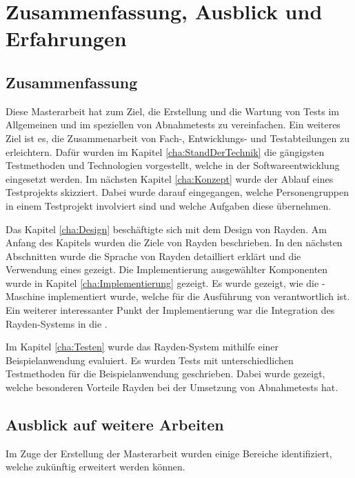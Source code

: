 \chapter{Zusammenfassung, Ausblick und Erfahrungen}
\label{cha:Zusammenfassung}

\section{Zusammenfassung}
Diese Masterarbeit hat zum Ziel, die Erstellung und die Wartung von Tests im Allgemeinen und im speziellen von Abnahmetests zu vereinfachen. Ein weiteres Ziel ist es, die Zusammenarbeit von Fach-, Entwicklungs- und Testabteilungen zu erleichtern. Dafür wurden im Kapitel \ref{cha:StandDerTechnik} die gängigsten Testmethoden und Technologien vorgestellt, welche in der Softwareentwicklung eingesetzt werden. Im nächsten Kapitel \ref{cha:Konzept} wurde der Ablauf eines Testprojekts skizziert. Dabei wurde darauf eingegangen, welche Personengruppen in einem Testprojekt involviert sind und welche Aufgaben diese übernehmen. 

\SuperPar
Das Kapitel \ref{cha:Design} beschäftigte sich mit dem Design von Rayden. Am Anfang des Kapitels wurden die Ziele von Rayden beschrieben. In den nächsten Abschnitten wurde die Sprache von Rayden detailliert erklärt und die Verwendung eines  gezeigt. Die Implementierung ausgewählter Komponenten wurde in Kapitel \ref{cha:Implementierung} gezeigt. Es wurde gezeigt, wie die -Maschine implementiert wurde, welche für die Ausführung von  verantwortlich ist. Ein weiterer interessanter Punkt der Implementierung war die Integration des Rayden-Systems in die . 

\SuperPar
Im Kapitel \ref{cha:Testen} wurde das Rayden-System mithilfe einer Beispielanwendung evaluiert. Es wurden Tests mit unterschiedlichen Testmethoden für die Beispielanwendung geschrieben. Dabei wurde gezeigt, welche besonderen Vorteile Rayden bei der Umsetzung von Abnahmetests hat.

\pagebreak
\section{Ausblick auf weitere Arbeiten}

Im Zuge der Erstellung der Masterarbeit wurden einige Bereiche identifiziert, welche zukünftig erweitert werden können.\\

